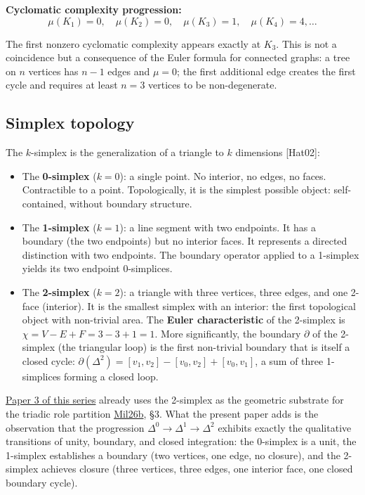\documentclass[12pt]{article}
\begin{document}
\textbf{Cyclomatic complexity progression:}
\[\mu(K_1) = 0, \quad \mu(K_2) = 0, \quad \mu(K_3) = 1, \quad \mu(K_4) = 4, \ldots\]

The first nonzero cyclomatic complexity appears exactly at \(K_3\). This
is not a coincidence but a consequence of the Euler formula for
connected graphs: a tree on \(n\) vertices has \(n-1\) edges and
\(\mu = 0\); the first additional edge creates the first cycle and
requires at least \(n = 3\) vertices to be non-degenerate.

\subsection{Simplex topology}\label{simplex-topology}

The \(k\)-simplex is the generalization of a triangle to \(k\)
dimensions {[}Hat02{]}:

\begin{itemize}
\item
  The \textbf{0-simplex} (\(k=0\)): a single point. No interior, no
  edges, no faces. Contractible to a point. Topologically, it is the
  simplest possible object: self-contained, without boundary structure.
\item
  The \textbf{1-simplex} (\(k=1\)): a line segment with two endpoints.
  It has a boundary (the two endpoints) but no interior faces. It
  represents a directed distinction with two endpoints. The boundary
  operator applied to a 1-simplex yields its two endpoint 0-simplices.
\item
  The \textbf{2-simplex} (\(k=2\)): a triangle with three vertices,
  three edges, and one 2-face (interior). It is the smallest simplex
  with an interior: the first topological object with non-trivial area.
  The \textbf{Euler characteristic} of the 2-simplex is
  \(\chi = V - E + F = 3 - 3 + 1 = 1\). More significantly, the boundary
  \(\partial\) of the 2-simplex (the triangular loop) is the first
  non-trivial boundary that is itself a closed cycle:
  \(\partial(\Delta^2) = [v_1, v_2] - [v_0, v_2] + [v_0, v_1]\), a sum
  of three 1-simplices forming a closed loop.
\end{itemize}

\href{https://github.com/baardev/truevalue/blob/main/docnav/Research/papers/3_minimal-recursive-triadic-framework/3_minimal-recursive-triadic-framework.pdf}{Paper
3 of this series} already uses the 2-simplex as the geometric substrate
for the triadic role partition
\href{https://github.com/baardev/truevalue/blob/main/docnav/Research/papers/3_minimal-recursive-triadic-framework/3_minimal-recursive-triadic-framework.pdf}{Mil26b},
§3. What the present paper adds is the observation that the progression
\(\Delta^0 \to \Delta^1 \to \Delta^2\) exhibits exactly the qualitative
transitions of unity, boundary, and closed integration: the 0-simplex is
a unit, the 1-simplex establishes a boundary (two vertices, one edge, no
closure), and the 2-simplex achieves closure (three vertices, three
edges, one interior face, one closed boundary cycle).
\end{document}
